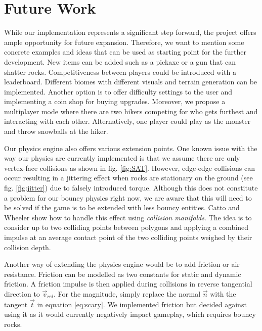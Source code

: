 \section{Future Work}

While our implementation represents a significant step forward, the project offers ample opportunity for future expansion. %
%
Therefore, we want to mention some concrete examples and ideas that can be used as starting point for the further development.
New items can be added such as a pickaxe or a gun that can shatter rocks.
Competitiveness between players could be introduced with a leaderboard.
Different biomes with different visuals and terrain generation can be implemented.  
Another option is to offer difficulty settings to the user and implementing a coin shop for buying upgrades.
Moreover, we propose a multiplayer mode where there are two hikers competing for who gets furthest and interacting with each other.
Alternatively, one player could play as the monster and throw snowballs at the hiker.

Our physics engine also offers various extension points.
One known issue with the way our physics are currently implemented is that we assume there are only vertex-face collisions as shown in fig. \ref{fig:SAT}.
However, edge-edge collisions can occur resulting in a jittering effect when rocks are stationary on the ground (see fig. \ref{fig:jitter}) due to falsely introduced torque.
Although this does not constitute a problem for our bouncy physics right now, we are aware that this will need to be solved if the game is to be extended with less bouncy entities.
Catto \cite{cattoManifolds} and Wheeler \cite{wheelerCD} show how to handle this effect using \emph{collision manifolds}.
The idea is to consider up to two colliding points between polygons and applying a combined impulse at an average contact point of the two colliding points weighed by their collision depth.

Another way of extending the physics engine would be to add friction or air resistance.
Friction can be modelled as two constants for static and dynamic friction.
A friction impulse is then applied during collisions in reverse tangential direction to $\vec{v}_{rel}$.
For the magnitude, simply replace the normal $\vec{n}$ with the tangent $\vec{t}$ in equation \ref{eq:scary}.
We implemented friction but decided against using it as it would currently negatively impact gameplay, which requires bouncy rocks.

